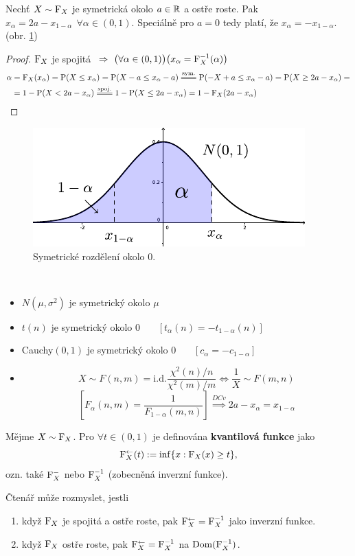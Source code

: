\begin{theorem}
	Nechť $X\sim \mathrm{F}_X$ je symetrická okolo $a\in\mathbb{R}$ a ostře roste. Pak\newline $x_\alpha = 2a-x_{1-\alpha}~~\forall \alpha\in(0,1)$. Speciálně pro $a=0$ tedy platí, že $x_\alpha = -x_{1-\alpha}$. (obr. \ref{fig:symetrie})
	\begin{proof}
		$\mathrm{F}_X$ je spojitá $~\Rightarrow~\bigl(\forall \alpha\in(0,1)\bigr)\bigl(x_\alpha=\mathrm{F}_X^{-1}(\alpha)\bigr)$
		\[
		\begin{split}
		\alpha&=\FF_X(x_\alpha)=\PP(X\leq x_\alpha)=\PP(X-a\leq x_\alpha-a)\equal{\text{sym.}}\PP(-X+a\leq x_\alpha-a)=\PP(X\geq 2a-x_\alpha)= \\ &=1-\PP(X< 2a-x_\alpha)\equal{\text{spoj.}}1-\PP(X\leq 2a-x_\alpha)=1-\FF_X(2a-x_\alpha)
		\end{split}
		\] 
	\end{proof}
\end{theorem}
\begin{figure}[h]
	\centering
	\includegraphics[width=0.4\linewidth]{symetrie}
	\caption{Symetrické rozdělení okolo 0.}
	\label{fig:symetrie}
\end{figure}
\begin{remark}~
		\begin{itemize}
		\item $N(\mu,\sigma^2)$ je symetrický okolo $\mu$
		\item $t(n)$ je symetrický okolo 0 ~~~$[t_\alpha(n)=-t_{1-\alpha}(n)]$
		\item Cauchy$(0,1)$ je symetrický okolo 0 ~~~$[c_\alpha=-c_{1-\alpha}]$
		\item 	$$ X\sim F(n,m)\equal{\text{i.d.}}\frac{\chi^2(n)/n}{\chi^2(m)/m}\Leftrightarrow \frac{1}{X}\sim F(m,n)$$ $$[F_\alpha(n,m)=\frac{1}{F_{1-\alpha}(m,n)}]  \stackrel{DCv}{~\Longrightarrow~} 2a-x_\alpha=x_{1-\alpha} $$
	\end{itemize} 

\end{remark}
\begin{define}
	Mějme $X\sim \mathrm{F}_X$. Pro $\forall t \in(0,1)$ je definována \textbf{kvantilová funkce} jako $$ \mathrm{F}_X^\leftarrow(t):=\inf\{ x:\mathrm{F}_X(x)\geq t \}, $$ ozn. také $\mathrm{F}_X^-$ nebo $\mathrm{F}_X^{-1}$ (zobecněná inverzní funkce).
\end{define}
\begin{remark}
	Čtenář může rozmyslet, jestli \begin{enumerate}
		\item když $\mathrm{F}_X$ je spojitá a ostře roste, pak $\mathrm{F}_X^\leftarrow=\mathrm{F}_X^{-1}$ jako inverzní funkce.
		\item když $\mathrm{F}_X$ ostře roste, pak $\mathrm{F}_X^\leftarrow=\mathrm{F}_X^{-1}$ na $\mathop{\mathrm{Dom} (\mathrm{F}_X^{-1})} $.
	\end{enumerate}
\end{remark}
